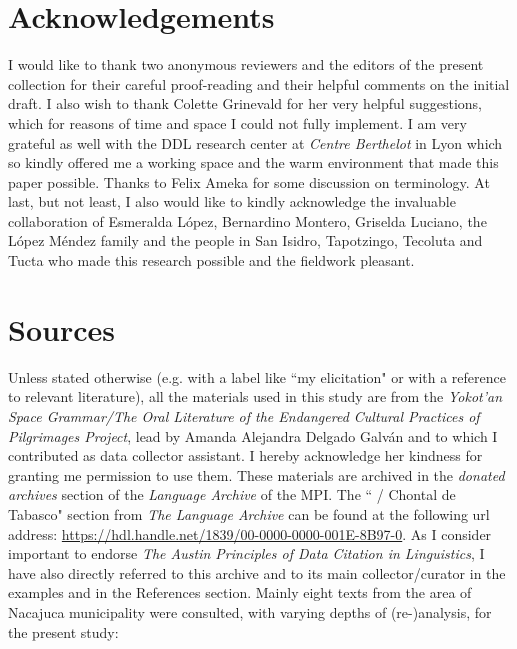 \documentclass[output=paper
,modfonts
,nonflat]{langsci/langscibook}
\begin{document}
\section*{Acknowledgements}
I would like to thank two anonymous reviewers and the editors of the present collection for their careful proof-reading and their helpful comments on the initial draft. I also wish to thank Colette Grinevald for her very helpful suggestions, which for reasons of time and space I could not fully implement. I am very grateful as well with the DDL research center at \textit{Centre Berthelot} in Lyon which so kindly offered me a working space and the warm environment that made this paper possible. Thanks to Felix Ameka for some discussion on terminology. At last, but not least, I also would like to kindly acknowledge the invaluable collaboration of Esmeralda López, Bernardino Montero, Griselda Luciano, the López Méndez family and the people in San Isidro, Tapotzingo, Tecoluta and Tucta who made this research possible and the fieldwork pleasant.


\section*{Sources}\label{sec:pico:sources}

Unless stated otherwise (e.g. with a label like ``my elicitation" or with a reference to relevant literature), all the materials used in this study are from the \textit{Yokot'an Space Grammar/The Oral Literature of the Endangered Cultural Practices of  Pilgrimages Project}, lead by Amanda Alejandra Delgado Galván and to which I contributed as data collector assistant. I hereby acknowledge her kindness for granting me permission to use them.
These materials are archived in the \textit{donated archives} section of the \textit{Language Archive} of the MPI.
The `` / Chontal de Tabasco" section from \textit{The Language Archive} can be found at the following url address: \url{https://hdl.handle.net/1839/00-0000-0000-001E-8B97-0}.
As I consider important to endorse \textit{The Austin Principles of Data Citation in Linguistics}, I have also directly referred to this archive and to its main collector/curator in the examples and in the References section.
Mainly eight texts from the area of Nacajuca municipality were consulted, with varying depths of (re-)analysis, for the present study:
\end{document}
